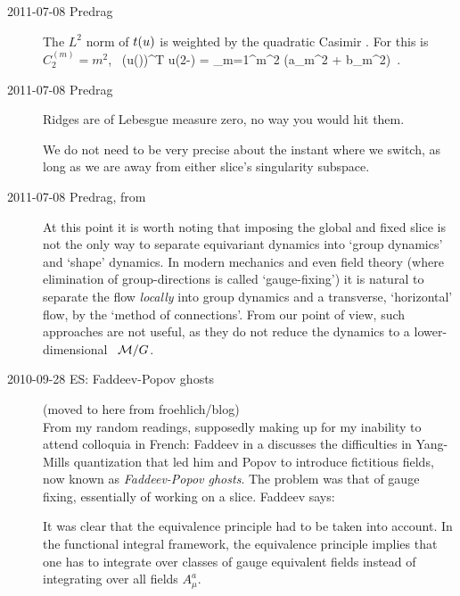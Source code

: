 \begin{description}
\item[2011-07-08 Predrag]
The $L^2$ norm of $t(u)$ is weighted by
the quadratic Casimir . For  this is
$C_2^{(m)} = m^2$,
\beq
\oint {}
     \, (\Lg u(\gSpace))^T \Lg u(2\pi-\gSpace)
= \sum_{m=1}^\infty m^2 \left(a_m^2 + b_m^2\right)
\,.




\item[2011-07-08 Predrag]
Ridges are of Lebesgue measure zero, no way you would hit them.

We do not need to be very precise about the instant
where we switch, as long as we are away from either slice's singularity
subspace.


\item[2011-07-08 Predrag, from ]                     \toCB
At this point it is worth noting that imposing the global and fixed slice
is not the only way to separate equivariant dynamics into `group
dynamics' and `shape' dynamics. In modern mechanics and even
field theory (where elimination of group-directions is called
`gauge-fixing') it is natural to separate the flow {\em locally} into
group dynamics and a transverse, `horizontal'
flow, by the `method of
connections'. From our point of view, such
approaches are not useful, as they do not reduce the dynamics to a
lower-dimensional \reducedsp\ ${\cal M}/G$.

\item[2010-09-28 ES: Faddeev-Popov ghosts]                    \toCB
(moved to here from froehlich/blog)
\\
From my random readings, supposedly making up for my inability to attend
colloquia in French: Faddeev in a
 discusses the difficulties in Yang-Mills quantization that led
him and Popov to introduce fictitious fields, now known as
\emph{Faddeev-Popov ghosts}. The problem was that of gauge fixing,
essentially of working on a slice. Faddeev says:

\begin{ttfamily}
It was clear that the equivalence principle had to be taken into account.
In the functional integral framework, the equivalence principle implies
that one has to integrate over classes of gauge equivalent fields instead
of integrating over all fields $A_\mu^a$.


\end{ttfamily}
\end{description}
